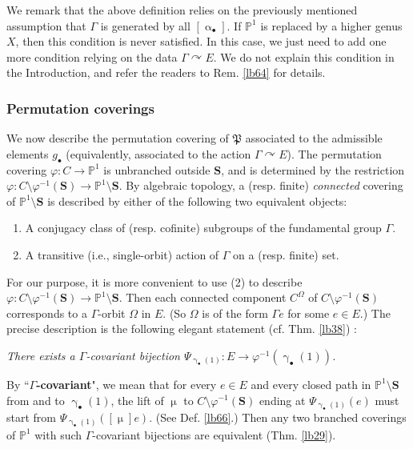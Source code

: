 \documentclass[11pt,b5paper,notitlepage]{article}
\theoremstyle{definition}
\theoremstyle{plain}
\newcommand{\fk}{\mathfrak}
\newcommand{\blt}{\bullet}
\newcommand{\Pbb}{\mathbb P}
\newcommand{\Sbf}{\mathbf{S}}
\numberwithin{equation}{subsection}
\begin{document}
We remark that the above definition relies on the previously mentioned assumption that $\Gamma$ is generated by all $[\upalpha_\blt]$. If $\Pbb^1$ is replaced by a higher genus $X$, then this condition is never satisfied. In this case, we just need to add one more condition relying on the data $\Gamma\curvearrowright E$. We do not explain this condition in the Introduction, and refer the readers to Rem. \ref{lb64} for details.


\subsubsection*{Permutation coverings}


We now describe the permutation covering of $\fk P$ associated to the admissible elements $g_\blt$ (equivalently, associated to the action $\Gamma\curvearrowright E$). The permutation covering  $\varphi:C\rightarrow\Pbb^1$ is unbranched outside $\Sbf$, and is determined by the restriction $\varphi:C\setminus\varphi^{-1}(\Sbf)\rightarrow\Pbb^1\setminus\Sbf$. By algebraic topology, a (resp. finite) \textit{connected} covering of $\Pbb^1\setminus\Sbf$ is described by either of the following two equivalent objects: 
\begin{enumerate}[label=(\arabic*)]
\item A conjugacy class of (resp. cofinite) subgroups of the fundamental group $\Gamma$.
\item A transitive (i.e., single-orbit) action of $\Gamma$  on a (resp. finite) set.
\end{enumerate}
For our purpose, it is more convenient to use (2) to describe $\varphi:C\setminus\varphi^{-1}(\Sbf)\rightarrow\Pbb^1\setminus\Sbf$. Then each connected component $C^\Omega$ of $C\setminus\varphi^{-1}(\Sbf)$ corresponds to a $\Gamma$-orbit $\Omega$ in $E$. (So $\Omega$ is of the form $\Gamma e$ for some $e\in E$.) The precise description is the following elegant statement (cf. Thm. \ref{lb38}) :

\textit{There exists a $\Gamma$-covariant bijection $\Psi_{\upgamma_\blt(1)}:E\rightarrow\varphi^{-1}(\upgamma_\blt(1))$.} 

By ``\textbf{$\Gamma$-covariant}", we mean that for every $e\in E$ and every closed path in $\Pbb^1\setminus\Sbf$ from and to $\upgamma_\blt(1)$, the lift of $\upmu$ to $C\setminus\varphi^{-1}(\Sbf)$ ending at $\Psi_{\upgamma_\blt(1)}(e)$ must start from $\Psi_{\upgamma_\blt(1)}([\upmu]e)$. (See Def. \ref{lb66}.) Then any two branched coverings of $\Pbb^1$ with such $\Gamma$-covariant bijections are equivalent (Thm. \ref{lb29}).
\end{document}
